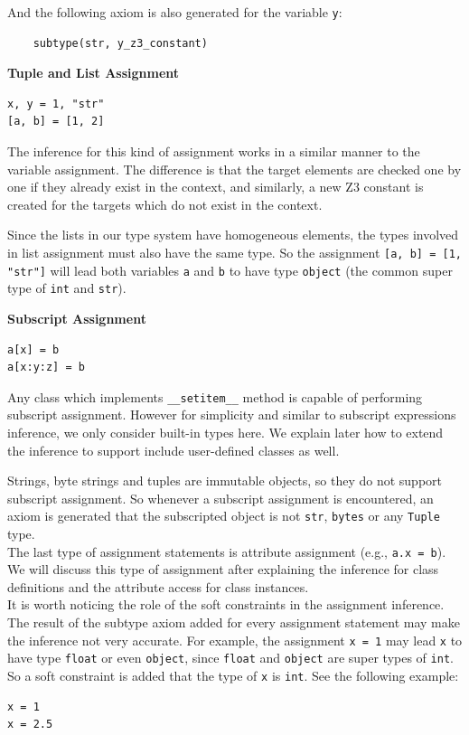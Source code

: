 And the following axiom is also generated for the variable \lstinline|y|:
\begin{lstlisting}
	subtype(str, y_z3_constant)
\end{lstlisting}

\textbf{Tuple and List Assignment}
\begin{lstlisting}
x, y = 1, "str"
[a, b] = [1, 2]
\end{lstlisting}

The inference for this kind of assignment works in a similar manner to the variable assignment. The difference is that the target elements are checked one by one if they already exist in the context, and similarly, a new Z3 constant is created for the targets which do not exist in the context.

Since the lists in our type system have homogeneous elements, the types involved in list assignment must also have the same type. So the assignment \lstinline|[a, b] = [1, "str"]| will lead both variables \lstinline|a| and \lstinline|b| to have type \lstinline|object| (the common super type of \lstinline|int| and \lstinline|str|).

\textbf{Subscript Assignment}
\begin{lstlisting}
a[x] = b
a[x:y:z] = b
\end{lstlisting}

Any class which implements \lstinline|__setitem__| method is capable of performing subscript assignment. However for simplicity and similar to subscript expressions inference, we only consider built-in types here. We explain later how to extend the inference to support include user-defined classes as well.

Strings, byte strings and tuples are immutable objects, so they do not support subscript assignment. So whenever a subscript assignment is encountered, an axiom is generated that the subscripted object is not \lstinline|str|, \lstinline|bytes| or any \lstinline|Tuple| type.\\

The last type of assignment statements is attribute assignment (e.g., \lstinline|a.x = b|). We will discuss this type of assignment after explaining the inference for class definitions and the attribute access for class instances.\\

It is worth noticing the role of the soft constraints in the assignment inference. The result of the subtype axiom added for every assignment statement may make the inference not very accurate. For example, the assignment \lstinline|x = 1| may lead \lstinline|x| to have type \lstinline|float| or even \lstinline|object|, since \lstinline|float| and \lstinline|object| are super types of \lstinline|int|. So a soft constraint is added that the type of \lstinline|x| is \lstinline|int|. See the following example:
\begin{lstlisting}
x = 1
x = 2.5
\end{lstlisting}

